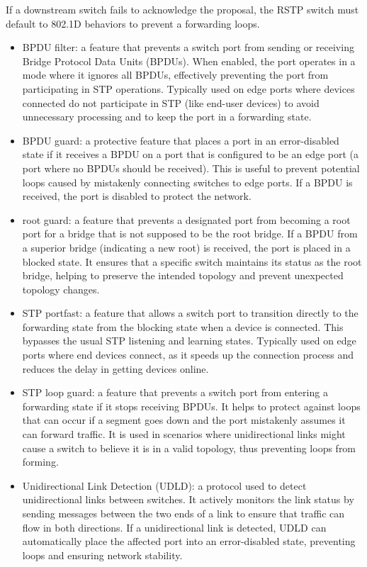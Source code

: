 \documentclass{article}
\begin{document}
If a downstream switch fails to acknowledge the proposal, the RSTP switch must default to 802.1D behaviors to prevent a forwarding loops.\\

\begin{itemize}
\item BPDU filter: a feature that prevents a switch port from sending or receiving Bridge Protocol Data Units (BPDUs). When enabled, the port operates in a mode where it ignores all BPDUs, effectively preventing the port from participating in STP operations. Typically used on edge ports where devices connected do not participate in STP (like end-user devices) to avoid unnecessary processing and to keep the port in a forwarding state.
\item BPDU guard: a protective feature that places a port in an error-disabled state if it receives a BPDU on a port that is configured to be an edge port (a port where no BPDUs should be received). This is useful to prevent potential loops caused by mistakenly connecting switches to edge ports. If a BPDU is received, the port is disabled to protect the network.
\item root guard: a feature that prevents a designated port from becoming a root port for a bridge that is not supposed to be the root bridge. If a BPDU from a superior bridge (indicating a new root) is received, the port is placed in a blocked state. It ensures that a specific switch maintains its status as the root bridge, helping to preserve the intended topology and prevent unexpected topology changes.
\item STP portfast:  a feature that allows a switch port to transition directly to the forwarding state from the blocking state when a device is connected. This bypasses the usual STP listening and learning states. Typically used on edge ports where end devices connect, as it speeds up the connection process and reduces the delay in getting devices online.
\item STP loop guard:  a feature that prevents a switch port from entering a forwarding state if it stops receiving BPDUs. It helps to protect against loops that can occur if a segment goes down and the port mistakenly assumes it can forward traffic. It is used in scenarios where unidirectional links might cause a switch to believe it is in a valid topology, thus preventing loops from forming.
\item Unidirectional Link Detection (UDLD): a protocol used to detect unidirectional links between switches. It actively monitors the link status by sending messages between the two ends of a link to ensure that traffic can flow in both directions. If a unidirectional link is detected, UDLD can automatically place the affected port into an error-disabled state, preventing loops and ensuring network stability.
\end{itemize}
\end{document}
